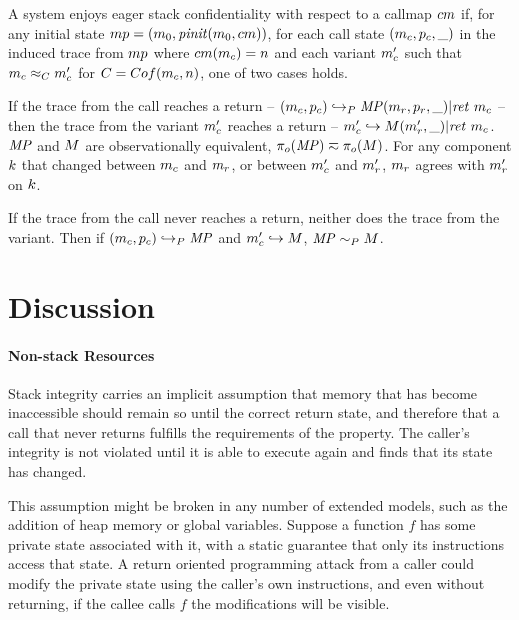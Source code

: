 \documentclass[acmsmall,review,anonymous]{acmart}\settopmatter{printfolios=true,printccs=false,printacmref=false}
\begin{document}
A system enjoys eager stack confidentiality with respect to a callmap
\(cm\) if, for any initial state \(mp =
(m_0,\mathit{pinit}(m_0,cm))\), for each call state
\((m_c,p_c,\_)\) in the induced trace from \(mp\)
where \(cm(m_c) = n\) and each variant \(m_c'\) such that
\(m_c \approx_C m_c'\) for \(C = Cof(m_c, n)\),
one of two cases holds.

If the trace from the call reaches a return -- \((m_c,p_c)
\hookrightarrow_P \mathit{MP} (m_r,p_r,\_) | \mathit{ret}\ m_c\) --
then the trace from the variant \(m_c'\) reaches a return --
\(m_c' \hookrightarrow M (m_r',\_) | \mathit{ret}\ m_c\).
\(\mathit{MP}\) and \(M\) are observationally equivalent, \(\pi_o(\mathit{MP}) \eqsim
\pi_o(M)\). For any component \(k\) that changed between
\(m_c\) and \(m_r\), or between \(m_c'\) and \(m_r'\),
\(m_r\) agrees with \(m_r'\) on \(k\).

If the trace from the call never reaches a return, neither does the
trace from the variant. Then if \((m_c,p_c) \hookrightarrow_P
\mathit{MP}\) and \(m_c' \hookrightarrow M\), \(\mathit{MP} \sim_P M\).


\section{Discussion}



  \paragraph{Non-stack Resources}

    Stack integrity carries an implicit assumption that memory that has
    become inaccessible should remain so until the correct return state, and
    therefore that a call that never returns fulfills the requirements of
    the property. The caller's integrity is not violated until it is able
    to execute again and finds that its state has changed.

    This assumption might be broken in any number of extended models, such as
    the addition of heap memory or global variables. Suppose a function \(f\)
    has some private state associated with it, with a static guarantee that
    only its instructions access that state. A return oriented programming
    attack from a caller could modify the private state using the caller's own
    instructions, and even without returning, if the callee calls \(f\) the
    modifications will be visible.
\end{document}

